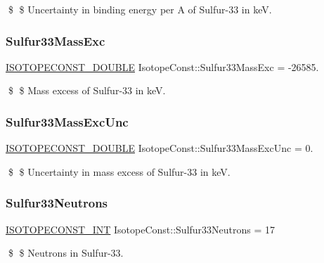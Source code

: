 \$ \$ Uncertainty in binding energy per A of Sulfur-\/33 in keV. \mbox{\label{group___isotope_const-_sulfur-_s33_ga17e4e2ae4d121834a5676e0c3527b830}} 
\subsubsection{\texorpdfstring{Sulfur33\+Mass\+Exc}{Sulfur33MassExc}}
{\footnotesize\ttfamily \mbox{\hyperlink{group___isotope_const-_macros_ga8f45a7272ce02c0b4c65c44636ed719a}{I\+S\+O\+T\+O\+P\+E\+C\+O\+N\+S\+T\+\_\+\+D\+O\+U\+B\+LE}} Isotope\+Const\+::\+Sulfur33\+Mass\+Exc = -\/26585.}

\$ \$ Mass excess of Sulfur-\/33 in keV. \mbox{\label{group___isotope_const-_sulfur-_s33_gacc991e44cddcd8dbb7fb8f7b7f63c9b3}} 
\subsubsection{\texorpdfstring{Sulfur33\+Mass\+Exc\+Unc}{Sulfur33MassExcUnc}}
{\footnotesize\ttfamily \mbox{\hyperlink{group___isotope_const-_macros_ga8f45a7272ce02c0b4c65c44636ed719a}{I\+S\+O\+T\+O\+P\+E\+C\+O\+N\+S\+T\+\_\+\+D\+O\+U\+B\+LE}} Isotope\+Const\+::\+Sulfur33\+Mass\+Exc\+Unc = 0.}

\$ \$ Uncertainty in mass excess of Sulfur-\/33 in keV. \mbox{\label{group___isotope_const-_sulfur-_s33_ga18b5d01b14fd8733eec20ef9f10093d9}} 
\subsubsection{\texorpdfstring{Sulfur33\+Neutrons}{Sulfur33Neutrons}}
{\footnotesize\ttfamily \mbox{\hyperlink{group___isotope_const-_macros_ga5f18360b3e99483a35c32d789e62621c}{I\+S\+O\+T\+O\+P\+E\+C\+O\+N\+S\+T\+\_\+\+I\+NT}} Isotope\+Const\+::\+Sulfur33\+Neutrons = 17}

\$ \$ Neutrons in Sulfur-\/33. \mbox{\label{group___isotope_const-_sulfur-_s33_gaa3c6580a5931a6566dbdd20283a1c02a}} 
